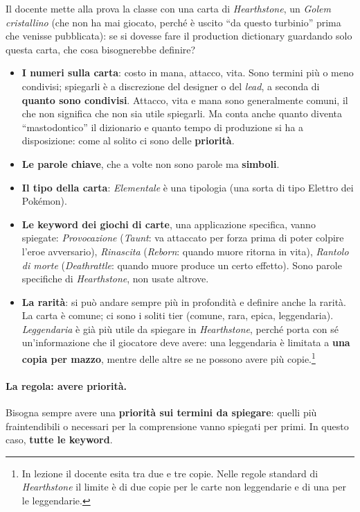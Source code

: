 Il docente mette alla prova la classe con una carta di \emph{Hearthstone}, un
\emph{Golem cristallino} (che non ha mai giocato, perché è uscito ``da questo
turbinio'' prima che venisse pubblicata): se si dovesse fare il production
dictionary guardando solo questa carta, che cosa bisognerebbe definire?

\begin{itemize}
  \item \textbf{I numeri sulla carta}: costo in mana, attacco, vita. Sono
        termini più o meno condivisi; spiegarli è a discrezione del designer
        o del \emph{lead}, a seconda di \textbf{quanto sono condivisi}.
        Attacco, vita e mana sono generalmente comuni, il che non significa
        che non sia utile spiegarli. Ma conta anche quanto diventa
        ``mastodontico'' il dizionario e quanto tempo di produzione si ha a
        disposizione: come al solito ci sono delle \textbf{priorità}.
  \item \textbf{Le parole chiave}, che a volte non sono parole ma
        \textbf{simboli}.
  \item \textbf{Il tipo della carta}: \emph{Elementale} è una tipologia (una
        sorta di tipo Elettro dei Pokémon).
  \item \textbf{Le keyword dei giochi di carte}, una applicazione specifica,
        vanno spiegate: \emph{Provocazione} (\emph{Taunt}: va attaccato per
        forza prima di poter colpire l'eroe avversario), \emph{Rinascita}
        (\emph{Reborn}: quando muore ritorna in vita), \emph{Rantolo di
        morte} (\emph{Deathrattle}: quando muore produce un certo effetto).
        Sono parole specifiche di \emph{Hearthstone}, non usate altrove.
  \item \textbf{La rarità}: si può andare sempre più in profondità e definire
        anche la rarità. La carta è comune; ci sono i soliti tier (comune,
        rara, epica, leggendaria). \emph{Leggendaria} è già più utile da
        spiegare in \emph{Hearthstone}, perché porta con sé un'informazione
        che il giocatore deve avere: una leggendaria è limitata a
        \textbf{una copia per mazzo}, mentre delle altre se ne possono avere
        più copie.\footnote{In lezione il docente esita tra due e tre copie.
        Nelle regole standard di \emph{Hearthstone} il limite è di due copie
        per le carte non leggendarie e di una per le leggendarie.}
\end{itemize}

\paragraph{La regola: avere priorità.} Bisogna sempre avere una
\textbf{priorità sui termini da spiegare}: quelli più fraintendibili o
necessari per la comprensione vanno spiegati per primi. In questo caso,
\textbf{tutte le keyword}.

